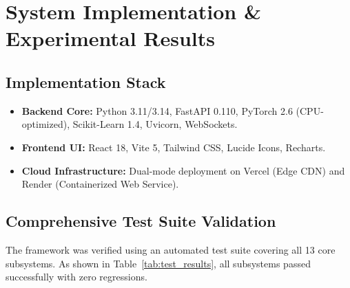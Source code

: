 \documentclass[12pt,a4paper]{report}
\begin{document}
\chapter{System Implementation \& Experimental Results}

\section{Implementation Stack}
\begin{itemize}
    \item \textbf{Backend Core:} Python 3.11/3.14, FastAPI 0.110, PyTorch 2.6 (CPU-optimized), Scikit-Learn 1.4, Uvicorn, WebSockets.
    \item \textbf{Frontend UI:} React 18, Vite 5, Tailwind CSS, Lucide Icons, Recharts.
    \item \textbf{Cloud Infrastructure:} Dual-mode deployment on Vercel (Edge CDN) and Render (Containerized Web Service).
\end{itemize}

\section{Comprehensive Test Suite Validation}
The framework was verified using an automated test suite covering all 13 core subsystems. As shown in Table~\ref{tab:test_results}, all subsystems passed successfully with zero regressions.
\end{document}
